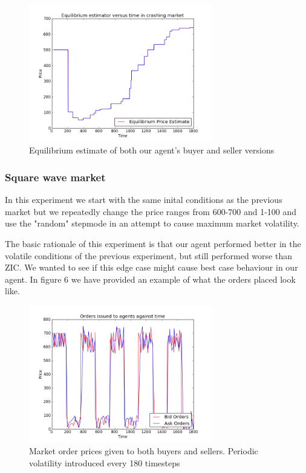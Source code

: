 \documentclass{acm_proc_article-sp}
\begin{document}
\begin{figure}[h!]
\includegraphics[width=80mm]{crash2.png} \caption{Equilibrium estimate of both
our agent's buyer and seller versions} \end{figure}

\subsubsection{Square wave market}

In this experiment we start with the same inital conditions as the previous
market but we repeatedly change the price ranges from 600-700 and 1-100 and use
the "random" stepmode in an attempt to cause maximum market volatility.

The basic rationale of this experiment is that our agent performed better in
the volatile conditions of the previous experiment, but still performed worse
than ZIC. We wanted to see if this edge case might cause best case behaviour in
our agent. In figure 6 we have provided an example of what the orders placed look
like.

\begin{figure}[h!] \includegraphics[width=80mm]{squarewave.png} \caption{Market
order prices given to both buyers and sellers. Periodic volatility introduced
every 180 timesteps} \end{figure}
\end{document}
